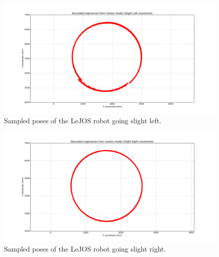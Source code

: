 \documentclass[paper=a4, fontsize=11pt]{scrartcl} %
\begin{document}
    \begin{figure}[H]
        \begin{center}
            \setlength{\fboxsep}{0.5pt} %
            \setlength{\fboxrule}{0.5pt}
            \includegraphics[width=\linewidth,fbox]{images/raw_slightLeft.png}
            \caption{Sampled poses of the LeJOS robot going slight left.}
        \end{center}
    \end{figure}

    \begin{figure}[H]
        \begin{center}
            \setlength{\fboxsep}{0.5pt} %
            \setlength{\fboxrule}{0.5pt}
            \includegraphics[width=\linewidth,fbox]{images/raw_slightRight.png}
            \caption{Sampled poses of the LeJOS robot going slight right.}
        \end{center}
    \end{figure}
\end{document}
